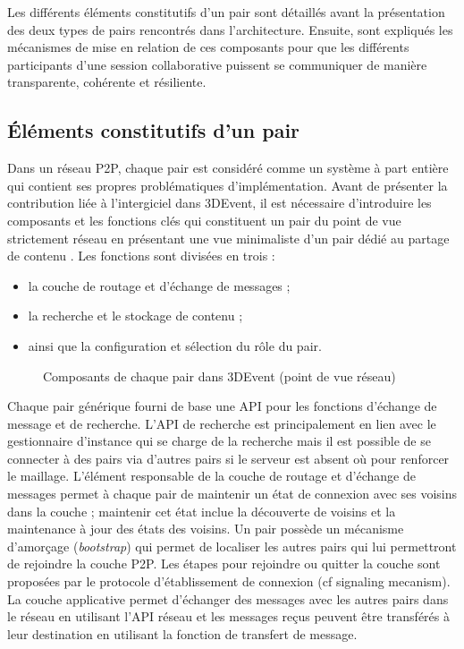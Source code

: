 Les différents éléments constitutifs d'un pair sont détaillés avant la présentation 
des deux types de pairs rencontrés dans l'architecture.
Ensuite, sont expliqués les mécanismes de mise en relation de 
ces composants pour que les différents participants d'une session 
collaborative puissent se communiquer de manière transparente, cohérente et 
résiliente.



\subsection{Éléments constitutifs d'un pair}
Dans un réseau \gls{P2P}, chaque pair est considéré comme un système à part 
entière qui contient ses propres problématiques d'implémentation. Avant de 
présenter la contribution liée à l'intergiciel dans 3DEvent, il est nécessaire 
d'introduire les composants et les fonctions clés qui constituent un pair du point de 
vue strictement réseau en 
présentant une vue minimaliste d'un pair dédié au partage de contenu 
\cite[p.135-136]{Buford2009}. Les 
fonctions sont divisées en trois :
\begin{itemize}
	\item la couche de routage et d'échange de messages ;
	\item la recherche et le stockage de contenu ;
	\item ainsi que la configuration et sélection du rôle du pair.
\end{itemize}


\begin{figure}[ht]
	\centering
	\caption{Composants de chaque pair dans 3DEvent (point de vue réseau)}
	\label{fig:middleware}
\end{figure}


Chaque pair générique fourni de base une \gls{API} pour les fonctions d'échange 
de message et de recherche. 
L'\gls{API} de recherche est principalement en lien avec le 
gestionnaire d'instance qui se charge de la recherche mais il est possible de se 
connecter à des pairs via d'autres pairs si le serveur est absent où pour renforcer 
le maillage.
L'élément responsable de la couche de routage et d'échange de messages permet 
à chaque pair de maintenir un état de connexion avec ses voisins dans la couche 
; maintenir cet état inclue la découverte de voisins et la maintenance  à jour des 
états des voisins.
Un pair possède un mécanisme d'amorçage (\textit{bootstrap}) qui permet de 
localiser les autres pairs qui lui permettront de rejoindre la couche \gls{P2P}. Les 
étapes pour rejoindre ou quitter la couche sont proposées par le protocole 
d'établissement de connexion 
(cf signaling mecanism).
La couche applicative permet  d'échanger des messages avec les autres pairs 
dans le réseau en utilisant l'\gls{API} réseau et les messages reçus peuvent être 
transférés à leur destination en utilisant la fonction de transfert de message. 

